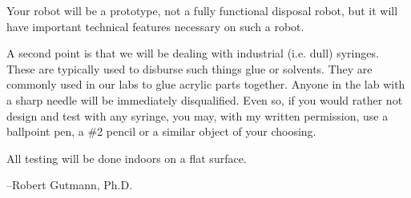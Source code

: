 Your robot will be a prototype, not a fully functional disposal robot, but it will have important technical features necessary on such a robot.

A second point is that we will be dealing with industrial (i.\+e. dull) syringes. These are typically used to disburse such things glue or solvents. They are commonly used in our labs to glue acrylic parts together. Anyone in the lab with a sharp needle will be immediately disqualified. Even so, if you would rather not design and test with any syringe, you may, with my written permission, use a ballpoint pen, a \#2 pencil or a similar object of your choosing.

All testing will be done indoors on a flat surface.

--Robert Gutmann, Ph.\+D. 